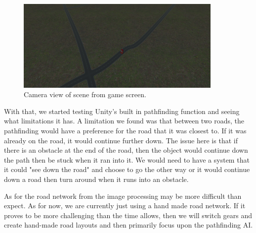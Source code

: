 \begin{figure}[!ht]
    \centering
    \includegraphics[width=10cm]{../Images/Update4/GameView.png}
       \caption{Camera view of scene from game screen.}
           \label{Fig:Gameview}
\end{figure}

\begin{flushleft}
With that, we started testing Unity's built in pathfinding function and seeing what limitations it has. A limitation we found was that between two roads, the pathfinding would have a preference for the road that it was closest to. If it was already on the road, it would continue further down. The issue here is that if there is an obstacle at the end of the road, then the object would continue down the path then be stuck when it ran into it. We would need to have a system that it could "see down the road" and choose to go the other way or it would continue down a road then turn around when it runs into an obstacle.
\end{flushleft}

\begin{flushleft}
As for the road network from the image processing may be more difficult than expect. As for now, we are currently just using a hand made road network. If it proves to be more challenging than the time allows, then we will switch gears and create hand-made road layouts and then primarily focus upon the pathfinding AI.
\end{flushleft}